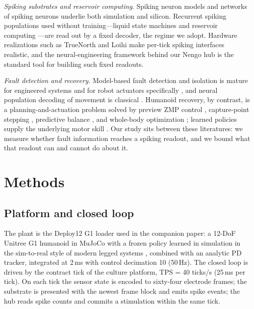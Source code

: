 \emph{Spiking substrates and reservoir computing.} Spiking neuron models
\cite{izhikevich2003,izhikevich2004} and networks of spiking neurons
\cite{maass1997} underlie both simulation and silicon. Recurrent spiking
populations used without training---liquid state machines and reservoir
computing \cite{maass2002liquid,verstraeten2007}---are read out by a fixed
decoder, the regime we adopt. Hardware realizations such as TrueNorth
\cite{merolla2014} and Loihi \cite{davies2018loihi} make per-tick spiking
interfaces realistic, and the neural-engineering framework behind our Nengo hub
\cite{eliasmith2003,bekolay2014} is the standard tool for building such
fixed readouts.

\emph{Fault detection and recovery.} Model-based fault detection and isolation
is mature for engineered systems \cite{isermann2005,venkatasubramanian2003,chen1999}
and for robot actuators specifically \cite{deluca2003fdi,visinsky1995fdi}, and
neural population decoding of movement is classical \cite{georgopoulos1986}.
Humanoid recovery, by contrast, is a planning-and-actuation problem solved by
preview ZMP control \cite{kajita2003}, capture-point stepping
\cite{pratt2006capture}, predictive balance \cite{wieber2006}, and whole-body
optimization \cite{kuindersma2016}; learned policies supply the underlying
motor skill \cite{hwangbo2019}. Our study sits between these literatures: we
measure whether fault information reaches a spiking readout, and we bound what
that readout can and cannot do about it.

\section{Methods}

\subsection{Platform and closed loop}

The plant is the Deploy12 G1 loader used in the companion paper: a 12-DoF
Unitree G1 humanoid in MuJoCo \cite{todorov2012} with a frozen policy learned
in simulation in the sim-to-real style of modern legged systems
\cite{hwangbo2019}, combined with an analytic PD tracker,
integrated at 2\,ms with control decimation 10 (50\,Hz). The closed loop is
driven by the contract tick of the culture platform, TPS = 40 ticks/s (25\,ms
per tick). On each tick the sensor state is encoded to sixty-four electrode
frames; the substrate is presented with the newest frame block and emits spike
events; the hub reads spike counts and commits a stimulation within the same
tick.

